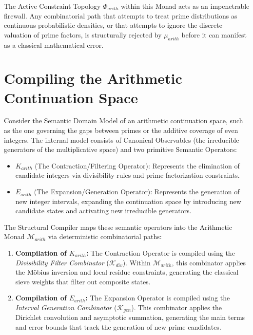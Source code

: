 \documentclass[12pt,openany]{extbook}
\theoremstyle{plain}
\theoremstyle{definition}
\begin{document}
The Active Constraint Topology $\Phi_{arith}$ within this Monad acts as an impenetrable firewall. Any combinatorial path that attempts to treat prime distributions as continuous probabilistic densities, or that attempts to ignore the discrete valuation of prime factors, is structurally rejected by $\mu_{arith}$ before it can manifest as a classical mathematical error.

\section{Compiling the Arithmetic Continuation Space}

Consider the Semantic Domain Model of an arithmetic continuation space, such as the one governing the gaps between primes or the additive coverage of even integers. The internal model consists of Canonical Observables (the irreducible generators of the multiplicative space) and two primitive Semantic Operators:
\begin{itemize}
    \item $K_{arith}$ (The Contraction/Filtering Operator): Represents the elimination of candidate integers via divisibility rules and prime factorization constraints.
    \item $E_{arith}$ (The Expansion/Generation Operator): Represents the generation of new integer intervals, expanding the continuation space by introducing new candidate states and activating new irreducible generators.
\end{itemize}

The Structural Compiler maps these semantic operators into the Arithmetic Monad $\mathcal{M}_{arith}$ via deterministic combinatorial paths:

\begin{enumerate}
    \item \textbf{Compilation of $K_{arith}$:} The Contraction Operator is compiled using the \emph{Divisibility Filter Combinator} ($\mathcal{K}_{div}$). Within $\mathcal{M}_{arith}$, this combinator applies the M\"{o}bius inversion and local residue constraints, generating the classical sieve weights that filter out composite states.
    \item \textbf{Compilation of $E_{arith}$:} The Expansion Operator is compiled using the \emph{Interval Generation Combinator} ($\mathcal{K}_{gen}$). This combinator applies the Dirichlet convolution and asymptotic summation, generating the main terms and error bounds that track the generation of new prime candidates.
\end{enumerate}
\end{document}
